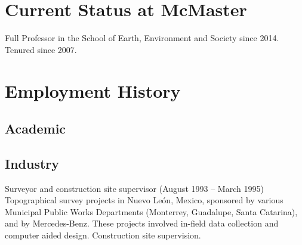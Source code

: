 \documentclass[11pt,a4paper,]{awesome-cv}
\begin{document}
\hypertarget{current-status-at-mcmaster}{%
\section{Current Status at McMaster}\label{current-status-at-mcmaster}}

Full Professor in the School of Earth, Environment and Society since
2014. Tenured since 2007.

\hypertarget{employment-history}{%
\section{Employment History}\label{employment-history}}

\hypertarget{academic}{%
\subsection{Academic}\label{academic}}

\begin{cventries}
    \vspace{-4.0mm}
    \vspace{-4.0mm}
    \vspace{-4.0mm}
    \vspace{-4.0mm}
    \vspace{-4.0mm}
\end{cventries}

\hypertarget{industry}{%
\subsection{Industry}\label{industry}}

Surveyor and construction site supervisor (August 1993 -- March 1995)
Topographical survey projects in Nuevo León, Mexico, sponsored by
various Municipal Public Works Departments (Monterrey, Guadalupe, Santa
Catarina), and by Mercedes-Benz. These projects involved in-field data
collection and computer aided design. Construction site supervision.
\end{document}
